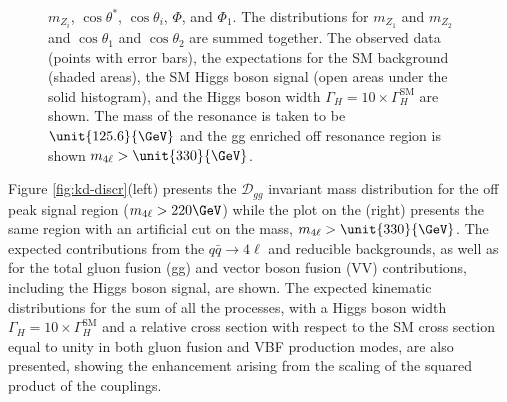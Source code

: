 \begin{figure}
{$m_{Z_i}$, $\cos\theta^*$, $\cos\theta_{i}$, $\Phi$, and $\Phi_{1}$. The distributions for $m_{Z_{1}}$ and $m_{Z_{2}}$ and $\cos\theta_{1}$ and $\cos\theta_{2}$ are summed together. The observed data (points with error bars), the expectations for the SM background (shaded areas),
the SM Higgs boson signal (open areas under the solid histogram), and the Higgs boson width $\Gamma_{H} = 10 \times \Gamma_{H}^{\mathrm{SM}}$ are shown. The mass of the resonance is taken to be $\unit{125.6}{\GeV}$ and the gg enriched off resonance region is shown $m_{4\ell} > \unit{330}{\GeV}$\cite{Khachatryan:2014iha}.}
\label{fig:Width_KD_inputs}
\end{figure}

Figure \ref{fig:kd-discr}(left) presents the $\mathcal{D}_{gg}$ invariant mass distribution
for the off peak signal region ($m_{4\ell} > 220\GeV$) while the plot on the (right) presents the same region with an artificial cut on the mass, $m_{4\ell} > \unit{330}{\GeV}$.
The expected contributions from the $q\bar{q} \to 4\ell$ and reducible backgrounds,
as well as for the total gluon fusion (gg) and vector boson fusion (VV) contributions, including the
Higgs boson signal, are shown. The expected kinematic distributions for the sum of all the
processes, with a Higgs boson width $\Gamma_{H} = 10 \times \Gamma_{H}^{\mathrm{SM}}$ and a relative
cross section with respect to the SM cross section equal to unity in both gluon fusion and VBF production
modes, are also presented, showing the enhancement arising from the scaling of the squared product of the couplings. 

